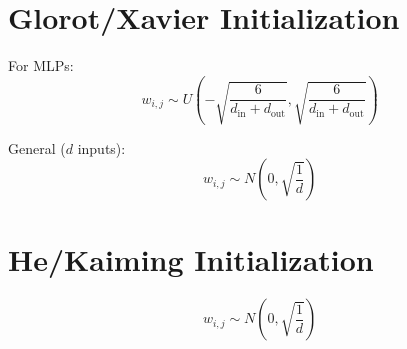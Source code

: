 \section{Glorot/Xavier Initialization}
For MLPs:
\begin{equation}
    w_{i,j} \sim U(-\sqrt{\frac{6}{d_\text{in} + d_\text{out}}},\sqrt{\frac{6}{d_\text{in} + d_\text{out}}})
\end{equation}

General ($d$ inputs):
\begin{equation}
    w_{i,j} \sim N\left(0, \sqrt{\frac{1}{d}}\right)
\end{equation}

\section{He/Kaiming Initialization}
\begin{equation}
    w_{i,j} \sim N\left(0, \sqrt{\frac{1}{d}}\right)
\end{equation}
